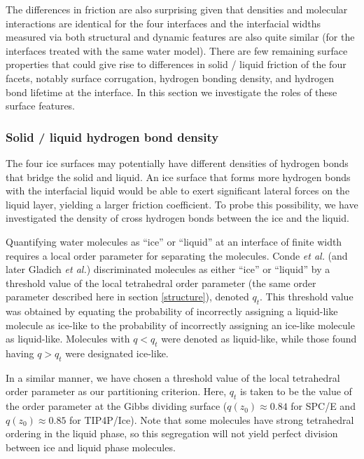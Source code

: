 The differences in friction are also surprising given that densities
and molecular interactions are identical for the four interfaces and
the interfacial widths measured via both structural and dynamic
features are also quite similar (for the interfaces treated with the
same water model). There are few remaining surface properties that
could give rise to differences in solid / liquid friction of the four
facets, notably surface corrugation, hydrogen bonding density, and
hydrogen bond lifetime at the interface. In this section we
investigate the roles of these surface features.

\subsubsection{Solid / liquid hydrogen bond density}
The four ice surfaces may potentially have different densities of
hydrogen bonds that bridge the solid and liquid. An ice surface that
forms more hydrogen bonds with the interfacial liquid would be able to
exert significant lateral forces on the liquid layer, yielding a
larger friction coefficient. To probe this possibility, we have
investigated the density of cross hydrogen bonds between the ice and
the liquid.

Quantifying water molecules as ``ice'' or ``liquid'' at an interface
of finite width requires a local order parameter for separating the
molecules.  Conde \textit{et al.}\cite{Conde2008} (and later Gladich
\textit{et al.}\cite{Gladich2011,Gladich2015}) discriminated molecules
as either ``ice'' or ``liquid'' by a threshold value of the local
tetrahedral order parameter (the same order parameter described here
in section \ref{structure}), denoted $q_{t}$. This threshold value was
obtained by equating the probability of incorrectly assigning a
liquid-like molecule as ice-like to the probability of incorrectly
assigning an ice-like molecule as liquid-like. Molecules with
$q < q_{t}$ were denoted as liquid-like, while those found having
$q > q_{t}$ were designated ice-like.

In a similar manner, we have chosen a threshold value of the local
tetrahedral order parameter as our partitioning criterion. Here,
$q_{t}$ is taken to be the value of the order parameter at the Gibbs
dividing surface ($q(z_0) \approx 0.84$ for SPC/E and
$q(z_0) \approx 0.85$ for TIP4P/Ice).  Note that some molecules have
strong tetrahedral ordering in the liquid phase, so this segregation
will not yield perfect division between ice and liquid phase
molecules.


